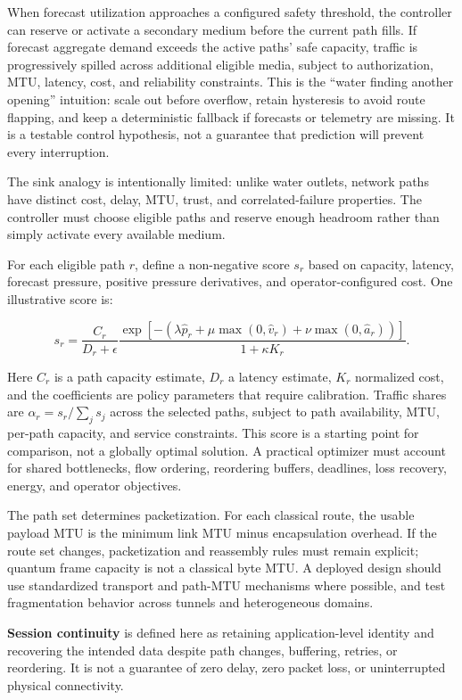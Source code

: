 \documentclass[
  american,
  11pt,
]{article}
\begin{document}
When forecast utilization approaches a configured safety threshold, the
controller can reserve or activate a secondary medium before the current
path fills. If forecast aggregate demand exceeds the active paths' safe
capacity, traffic is progressively spilled across additional eligible
media, subject to authorization, MTU, latency, cost, and reliability
constraints. This is the ``water finding another opening'' intuition:
scale out before overflow, retain hysteresis to avoid route flapping,
and keep a deterministic fallback if forecasts or telemetry are missing.
It is a testable control hypothesis, not a guarantee that prediction
will prevent every interruption.

The sink analogy is intentionally limited: unlike water outlets, network
paths have distinct cost, delay, MTU, trust, and correlated-failure
properties. The controller must choose eligible paths and reserve enough
headroom rather than simply activate every available medium.

For each eligible path \(r\), define a non-negative score \(s_r\) based
on capacity, latency, forecast pressure, positive pressure derivatives,
and operator-configured cost. One illustrative score is:

\[s_r=
\frac{C_r}{D_r+\epsilon}
\frac{\exp[-(\lambda\hat p_r+\mu\max(0,\hat v_r)
+\nu\max(0,\hat a_r))]}
{1+\kappa K_r}.\]

Here \(C_r\) is a path capacity estimate, \(D_r\) a latency estimate,
\(K_r\) normalized cost, and the coefficients are policy parameters that
require calibration. Traffic shares are \(\alpha_r=s_r/\sum_j s_j\)
across the selected paths, subject to path availability, MTU, per-path
capacity, and service constraints. This score is a starting point for
comparison, not a globally optimal solution. A practical optimizer must
account for shared bottlenecks, flow ordering, reordering buffers,
deadlines, loss recovery, energy, and operator objectives.

The path set determines packetization. For each classical route, the
usable payload MTU is the minimum link MTU minus encapsulation overhead.
If the route set changes, packetization and reassembly rules must remain
explicit; quantum frame capacity is not a classical byte MTU. A deployed
design should use standardized transport and path-MTU mechanisms where
possible, and test fragmentation behavior across tunnels and
heterogeneous domains.

\textbf{Session continuity} is defined here as retaining
application-level identity and recovering the intended data despite path
changes, buffering, retries, or reordering. It is not a guarantee of
zero delay, zero packet loss, or uninterrupted physical connectivity.
\end{document}
